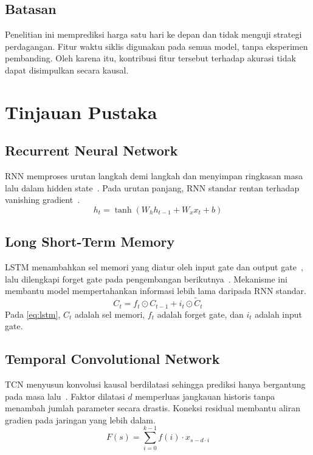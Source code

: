 \documentclass[conference,a4paper]{IEEEtran}
\begin{document}
\subsection{Batasan}
Penelitian ini memprediksi harga satu hari ke depan dan tidak menguji strategi perdagangan. Fitur waktu siklis digunakan pada semua model, tanpa eksperimen pembanding. Oleh karena itu, kontribusi fitur tersebut terhadap akurasi tidak dapat disimpulkan secara kausal.

\section{Tinjauan Pustaka}

\subsection{Recurrent Neural Network}
RNN memproses urutan langkah demi langkah dan menyimpan ringkasan masa lalu dalam hidden state~\cite{elman1990}. Pada urutan panjang, RNN standar rentan terhadap vanishing gradient~\cite{bengio1994}.
\begin{equation}
h_t = \tanh(W_h h_{t-1} + W_x x_t + b)
\label{eq:rnn}
\end{equation}

\subsection{Long Short-Term Memory}
LSTM menambahkan sel memori yang diatur oleh input gate dan output gate~\cite{hochreiter1997}, lalu dilengkapi forget gate pada pengembangan berikutnya~\cite{gers2000}. Mekanisme ini membantu model mempertahankan informasi lebih lama daripada RNN standar.
\begin{equation}
C_t = f_t \odot C_{t-1} + i_t \odot \tilde{C}_t
\label{eq:lstm}
\end{equation}
Pada \eqref{eq:lstm}, $C_t$ adalah sel memori, $f_t$ adalah forget gate, dan $i_t$ adalah input gate.

\subsection{Temporal Convolutional Network}
TCN menyusun konvolusi kausal berdilatasi sehingga prediksi hanya bergantung pada masa lalu~\cite{bai2018}. Faktor dilatasi $d$ memperluas jangkauan historis tanpa menambah jumlah parameter secara drastis. Koneksi residual membantu aliran gradien pada jaringan yang lebih dalam.
\begin{equation}
F(s) = \sum_{i=0}^{k-1} f(i) \cdot x_{s-d \cdot i}
\label{eq:tcn}
\end{equation}
\end{document}
